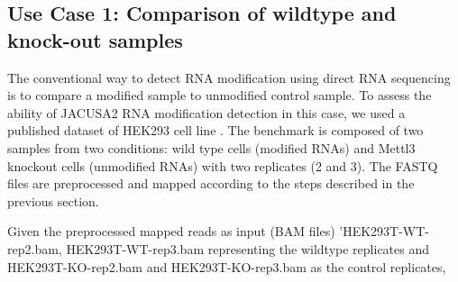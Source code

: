 \documentclass[times, 11pt, a4paper]{article}
\begin{document}
\subsection*{Use Case 1: Comparison of wildtype and knock-out samples}
The conventional way to detect RNA modification using direct RNA sequencing is to compare a modified sample to unmodified control sample. To assess the ability of JACUSA2 RNA modification detection in this case, we used a published dataset of HEK293 cell line \cite{pratanwanich2021identification}. The benchmark is composed of two samples from two conditions: wild type cells (modified RNAs) and Mettl3 knockout cells (unmodified RNAs) with two replicates (2 and 3). The FASTQ files are preprocessed and mapped according to the steps described in the previous section.
 
Given the preprocessed mapped reads as input (BAM files) 'HEK293T-WT-rep2.bam, HEK293T-WT-rep3.bam representing the wildtype replicates and HEK293T-KO-rep2.bam and  HEK293T-KO-rep3.bam as the control replicates, 
\end{document}
